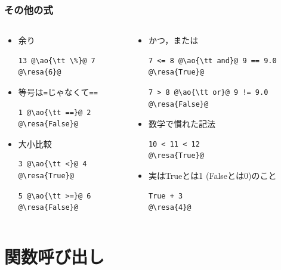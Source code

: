 \documentclass[10pt,dvipdfmx]{beamer}
\newcommand{\ore}[1]{{\color{orange}#1}}
\newcommand{\ao}[1]{{\color{blue}#1}}
\newcommand{\resa}[1]{\ore{\textsl{$\rightarrow$ #1}}}
\begin{document}
\begin{frame}[fragile]
\frametitle{その他の式}
\begin{columns}
\begin{column}{0.5\textwidth}
\begin{itemize}
\item 余り
\begin{lstlisting}
13 @\ao{\tt \%}@ 7
@\resa{6}@
\end{lstlisting}

\item 等号は{\tt =}じゃなくて{\tt ==}
\begin{lstlisting}
1 @\ao{\tt ==}@ 2
@\resa{False}@
\end{lstlisting}

\item 大小比較
\begin{lstlisting}
3 @\ao{\tt <}@ 4
@\resa{True}@
\end{lstlisting}
\begin{lstlisting}
5 @\ao{\tt >=}@ 6
@\resa{False}@
\end{lstlisting}
\end{itemize}
\end{column} 
 
\begin{column}{0.5\textwidth}
\begin{itemize}
\item かつ，または
\begin{lstlisting}
7 <= 8 @\ao{\tt and}@ 9 == 9.0 
@\resa{True}@
\end{lstlisting}
\begin{lstlisting}
7 > 8 @\ao{\tt or}@ 9 != 9.0 
@\resa{False}@
\end{lstlisting}

\item 数学で慣れた記法
\begin{lstlisting}
10 < 11 < 12
@\resa{True}@
\end{lstlisting}

\item 実はTrueとは1 (Falseとは0)のこと
\begin{lstlisting}
True + 3
@\resa{4}@
\end{lstlisting}
\end{itemize}
\end{column}
\end{columns}
\end{frame}

\section{関数呼び出し}
\end{document}
